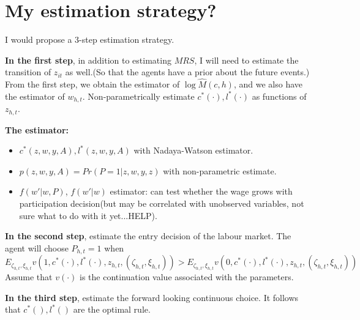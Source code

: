 \section{My estimation strategy?}
I would propose a 3-step estimation strategy.

\textbf{In the first step}, in addition to estimating $MRS$, I will need to estimate the transition of $z_{it}$ as well.(So that the agents have a prior about the future events.)
From the first step, we obtain the estimator of $\log \hat{M}(c,h)$, and we also have the estimator of $w_{h,t}$. Non-parametrically estimate $c^*(\cdot),l^*(\cdot)$ as functions of $z_{h,t}$.

\textbf{The estimator:}
\begin{itemize}
  \item $c^{*}(z,w,y,A),l^{*}(z,w,y,A)$ with Nadaya-Watson estimator.
  \item $p(z,w,y,A) = Pr(P=1|z,w,y,z)$ with non-parametric estimate.
  \item $f(w'|w,P)$, $f(w'|w)$ estimator: can test whether the wage grows with participation decision(but may be correlated with unobserved variables, not sure what to do with it yet...HELP).
\end{itemize}


\textbf{In the second step}, estimate the entry decision of the labour market.
The agent will choose $P_{h,t}=1$ when $E_{\zeta_{h,t},\xi_{h,t}} v(1,c^*(\cdot),l^*(\cdot),z_{h,t},(\zeta_{h,t},\xi_{h,t})) > E_{\zeta_{h,t},\xi_{h,t}} v(0,c^*(\cdot),l^*(\cdot),z_{h,t},(\zeta_{h,t},\xi_{h,t}))$
Assume that $v(\cdot)$ is the continuation value associated with the parameters.

\textbf{In the third step}, estimate the forward looking continuous choice.
It follows that $c^*(),l^*()$ are the optimal rule.
